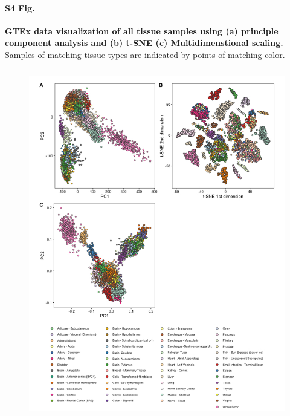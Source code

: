 \documentclass[10pt,letterpaper]{article}
\begin{document}
\paragraph*{S4 Fig.}

\label{figS4}
{\bf GTEx data visualization of all tissue samples using (a) principle component analysis and (b) t-SNE
(c) Multidimenstional scaling.}
Samples of matching tissue types are indicated by points of matching color.
\begin{figure}[ht]
\centering
\includegraphics[height=6in, width=5in]{../../src/figure/gtex-other-methods.Rmd/gtex-with-legend.png}
\end{figure}
\end{document}
